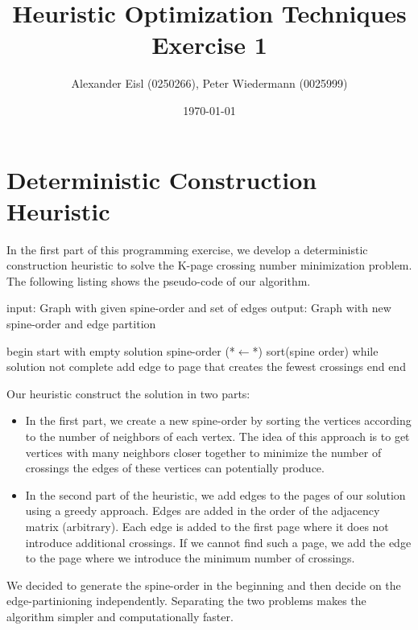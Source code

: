 \documentclass{scrartcl}
\author{Alexander Eisl (0250266), Peter Wiedermann (0025999)}
\date{\today}
\title{Heuristic Optimization Techniques \\ Exercise 1}
\begin{document}
\maketitle


\section{Deterministic Construction Heuristic}
\label{sec:deterministic}
In the first part of this programming exercise, we develop a
deterministic construction heuristic to solve the K-page crossing
number minimization problem. The following listing shows the
pseudo-code of our algorithm.

\begin{algorithm}[caption={Deterministic construction heuristic}]
    input: Graph with given spine-order and set of edges
    output: Graph with new spine-order and edge partition

    begin
       start with empty solution
       spine-order (*$\leftarrow$*) sort(spine order)
       while solution not complete
           add edge to page that creates the fewest crossings
       end 
    end
\end{algorithm}

Our heuristic construct the solution in two parts:

\begin{itemize}
\item In the first part, we create a new spine-order by sorting the
  vertices according to the number of neighbors of each vertex. The
  idea of this approach is to get vertices with many neighbors closer
  together to minimize the number of crossings the edges of these
  vertices can potentially produce.

\item In the second part of the heuristic, we add edges to the pages
  of our solution using a greedy approach. Edges are added in the
  order of the adjacency matrix (arbitrary).  Each edge is added to
  the first page where it does not introduce additional crossings.  If
  we cannot find such a page, we add the edge to the page where we
  introduce the minimum number of crossings.
\end{itemize}

We decided to generate the spine-order in the beginning and then
decide on the edge-partinioning independently. Separating the two
problems makes the algorithm simpler and computationally faster.
\end{document}
